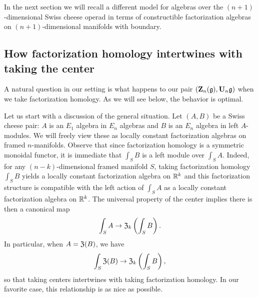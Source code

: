 \documentclass[11pt]{amsart}
\numberwithin{equation}{section}
\begin{document}
In the next section we will recall a different model for algebras over the $(n+1)$-dimensional Swiss cheese operad in terms of constructible factorization algebras on $(n+1)$-dimensional manifolds with boundary. 

%
%

\subsection{How factorization homology intertwines with taking the center}

A natural question in our setting is what happens to our pair $(\mathbf Z_n(\mathfrak g), \mathbf U_n \mathfrak g)$ when we take factorization homology.
As we will see below, the behavior is optimal.

Let us start with a discussion of the general situation.
Let $(A,B)$ be a Swiss cheese pair: $A$ is an $E_1$ algebra in $E_n$ algebras and $B$ is an $E_n$ algebra in left $A$-modules. 
We will freely view these as locally constant factorization algebras on framed $n$-manifolds.
Observe that since factorization homology is a symmetric monoidal functor, 
it is immediate that $\int_S B$ is a left module over $\int_S A$.
Indeed, for any $(n-k)$-dimensional framed manifold $S$, 
taking factorization homology $\int_S B$ yields a locally constant factorization algebra on $\mathbb R^k$ 
and this factorization structure is compatible with the left action of $\int_S A$ as a locally constant factorization algebra on $\mathbb R^k$.
The universal property of the center implies there is then a canonical map
\[
\int_{S} A \to \mathfrak Z_k \left( \int_S B \right).
\]
In particular, when $A = \mathfrak Z(B)$, we have
\begin{equation}
\label{eqn: can cen int}
\int_{S} \mathfrak Z(B) \to \mathfrak Z_k \left( \int_S B \right),
\end{equation}
so that taking centers intertwines with taking factorization homology.
In our favorite case, this relationship is as nice as possible.
\end{document}
